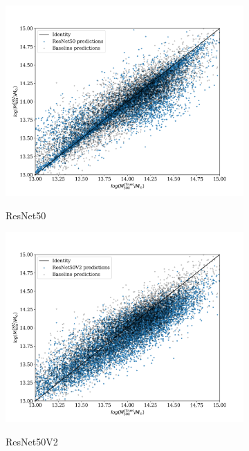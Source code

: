 \begin{figure}[H]
\begin{subfigure}{.325\textwidth}
    \centering
    \includegraphics[width=\linewidth]{images/Chapter4/Results/training_ResNet50_scatter.png}
    \label{fig:training_ResNet50_scatter}
    \caption{ResNet50}
\end{subfigure}
\begin{subfigure}{.325\textwidth}
    \centering
    \includegraphics[width=\linewidth]{images/Chapter4/Results/training_ResNet50V2_scatter.png}
    \label{fig:training_ResNet50V2_scatter}
    \caption{ResNet50V2}
\end{subfigure}
\begin{subfigure}{.325\textwidth}

\end{subfigure}
\end{figure}
